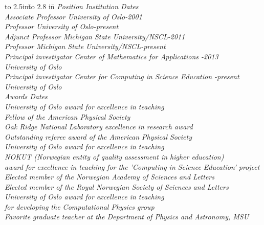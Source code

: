 \documentclass[10pt,a4wide]{revtex4-1}
\begin{document}
\begin{center}
\begin{tabbing}
\hbox to 2.5in{}\=\hbox to 2.8 in{}\=\kill
%
\it Position  \>  \it Institution  \> \it Dates  \\
Associate Professor \> University of Oslo-2001 \\
Professor \> University of Oslo-present \\
Adjunct Professor \> Michigan State University/NSCL-2011 \\
Professor \> Michigan State University/NSCL-present \\
Principal investigator \> Center of Mathematics for Applications -2013 \\
\> University of Oslo \> \\
Principal investigator \> Center for Computing in Science Education -present \\
\> University of Oslo \> \\
\it Awards \>  \it   \> \it Dates  \\
University of Oslo award for excellence in teaching \>  \\
Fellow of the American Physical Society \>  \\
Oak Ridge National Laboratory excellence in research award \>  \\
Outstanding referee award of the American Physical Society\>  \\
University of Oslo award for excellence in teaching\>  \\
NOKUT (Norwegian entity of quality assessment in higher education) \>  \\
award for excellence in teaching for the 'Computing in Science Education' project\> \> \\
Elected member of the Norwegian Academy of Sciences and Letters\>  \\
Elected member of the Royal Norwegian Society of Sciences and Letters \>  \\
University of Oslo award for excellence in teaching \> \\
for developing the Computational Physics group \> \> \\
Favorite graduate teacher at the Department of Physics and Astronomy, MSU \> \\
%
%
\end{tabbing}
\end{center}
\end{document}
